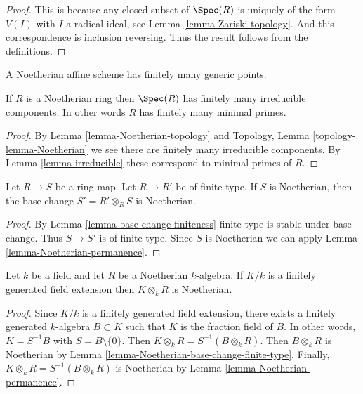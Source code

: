 \begin{proof}
This is because any closed subset of $\Spec(R)$
is uniquely of the form $V(I)$ with $I$ a radical ideal,
see Lemma \ref{lemma-Zariski-topology}.
And this correspondence is inclusion reversing.
Thus the result follows from the definitions.
\end{proof}

\begin{lemma}
\label{lemma-Noetherian-irreducible-components}
\begin{slogan}
A Noetherian affine scheme has finitely many generic points.
\end{slogan}
If $R$ is a Noetherian ring then $\Spec(R)$
has finitely many irreducible components. In other words
$R$ has finitely many minimal primes.
\end{lemma}

\begin{proof}
By Lemma \ref{lemma-Noetherian-topology} and
Topology, Lemma \ref{topology-lemma-Noetherian}
we see there are finitely many irreducible components.
By Lemma \ref{lemma-irreducible} these correspond to
minimal primes of $R$.
\end{proof}

\begin{lemma}
\label{lemma-Noetherian-base-change-finite-type}
Let $R \to S$ be a ring map. Let $R \to R'$ be of finite type.
If $S$ is Noetherian, then the base change $S' = R' \otimes_R S$
is Noetherian.
\end{lemma}

\begin{proof}
By Lemma \ref{lemma-base-change-finiteness} finite type is stable under
base change. Thus $S \to S'$ is of finite type. Since $S$ is Noetherian we
can apply Lemma \ref{lemma-Noetherian-permanence}.
\end{proof}

\begin{lemma}
\label{lemma-Noetherian-field-extension}
Let $k$ be a field and let $R$ be a Noetherian $k$-algebra.
If $K/k$ is a finitely generated field extension then
$K \otimes_k R$ is Noetherian.
\end{lemma}

\begin{proof}
Since $K/k$ is a finitely generated field extension, there exists
a finitely generated $k$-algebra $B \subset K$ such that $K$ is
the fraction field of $B$. In other words, $K = S^{-1}B$
with $S = B \setminus \{0\}$. Then $K \otimes_k R = S^{-1}(B \otimes_k R)$.
Then $B \otimes_k R$ is Noetherian by
Lemma \ref{lemma-Noetherian-base-change-finite-type}.
Finally, $K \otimes_k R = S^{-1}(B \otimes_k R)$ is Noetherian by
Lemma \ref{lemma-Noetherian-permanence}.
\end{proof}

